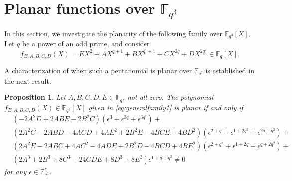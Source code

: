 \documentclass[12pt]{amsart}
\newtheorem{proposition}[theorem]{Proposition}
\def\fqt{\mathbb{F}_{q^3}}
\begin{document}
	\section{Planar functions over \texorpdfstring{$\fqt$}{Fq3}}
	
	
		In this section, we investigate the planarity of the following family  over $\mathbb{F}_{q^3}[X]$. Let $q$ be a power of an odd prime, and  
consider
	\begin{equation}\label{eq:generalfamily1}
		f_{E,A,B,C,D}(X) =  EX^2+AX^{q+1}+ BX^{q^2+1}+CX^{2q} +DX^{2q^2} \in \mathbb{F}_{q}[X].
	\end{equation}

A characterization of when such a pentanomial is planar over $\mathbb{F}_{q^3}$ is established in the next result. 
		\begin{proposition}\label{Prop:Condition}
		Let  $A,B,C,D,E\in \mathbb{F}_{q}$, not all zero. The polynomial $f_{E,A,B,C,D}(X)  \in \mathbb{F}_{q^3}[X]$ given in \eqref{eq:generalfamily1} is planar if and only if 
		\begin{align*}
			&(-2A^2D + 2ABE - 2B^2C)(\epsilon^3 + \epsilon^{3q} + \epsilon^{3q^2})+ \\
			&(2A^2C - 2ABD - 4ACD + 4AE^2 + 2B^2E - 4BCE + 4BD^2)(\epsilon^{2+q} + \epsilon^{1+2q^2} + \epsilon^{2q+q^2})+ \\
			&(2A^2E - 2ABC + 4AC^2 - 4ADE + 2B^2D - 4BCD + 4BE^2)(\epsilon^{2+q^2} + \epsilon^{1+2q} + \epsilon^{q+2q^2})+ \\
			&(2A^3 + 2B^3 + 8C^3 - 24CDE + 8D^3 + 8E^3)\epsilon^{1+q+q^2} \neq 0
		\end{align*} 
		for any  $\epsilon\in \mathbb{F}_{q^3}^*$.
	\end{proposition}
\end{document}

